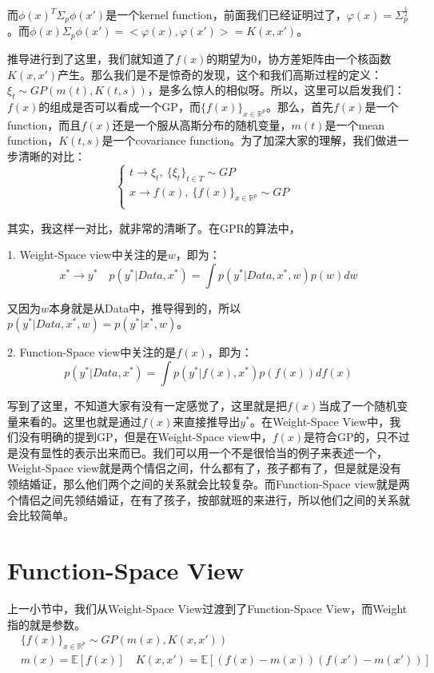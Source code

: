 \documentclass[a4paper]{article}
\begin{document}
而$\phi(x)^T\Sigma_p\phi(x')$是一个kernel function，前面我们已经证明过了，$\varphi(x) = \Sigma_p^{\frac{1}{2}}$。而$\phi(x)\Sigma_p\phi(x') = <\varphi(x),\varphi(x')> = K(x,x')$。

推导进行到了这里，我们就知道了$f(x)$的期望为0，协方差矩阵由一个核函数$K(x,x')$产生。那么我们是不是惊奇的发现，这个和我们高斯过程的定义：$\xi_t \sim GP(m(t),K(t,s))$，是多么惊人的相似呀。所以，这里可以启发我们：{\color{red} $f(x)$的组成是否可以看成一个GP，而$\{f(x)\}_{x\in\mathbb{R}^p}$。}那么，首先$f(x)$是一个function，而且$f(x)$还是一个服从高斯分布的随机变量，$m(t)$是一个mean function，$K(t,s)$是一个covariance function。为了加深大家的理解，我们做进一步清晰的对比：
\begin{equation}
    \left\{
        \begin{array}{ll}
            t \longrightarrow \xi_t, \ \{ \xi_t \}_{t\in T}\sim GP & \\
            x \longrightarrow f(x), \ \{ f(x) \}_{x\in \mathbb{R}^p}\sim GP & \\
\end{array}
\right.
\end{equation}

其实，我这样一对比，就非常的清晰了。在GPR的算法中，

1. Weight-Space view中关注的是$w$，即为：
\begin{equation}
    x^\ast \longrightarrow y^\ast \quad p(y^\ast|Data,x^\ast) = \int p(y^\ast|Data,x^\ast,w)p(w)dw
\end{equation}

又因为$w$本身就是从Data中，推导得到的，所以$p(y^\ast|Data,x^\ast,w) = p(y^\ast|x^\ast,w)$。

2. Function-Space view中关注的是$f(x)$，即为：
\begin{equation}
    p(y^\ast | Data,x^\ast)  = \int p(y^\ast | f(x),x^\ast)p(f(x))df(x)
\end{equation}

写到了这里，不知道大家有没有一定感觉了，这里就是把$f(x)$当成了一个随机变量来看的。这里也就是通过$f(x)$来直接推导出$y^\ast$。在Weight-Space View中，我们没有明确的提到GP，但是在Weight-Space view中，$f(x)$是符合GP的，只不过是没有显性的表示出来而已。我们可以用一个不是很恰当的例子来表述一个，Weight-Space view就是两个情侣之间，什么都有了，孩子都有了，但是就是没有领结婚证，那么他们两个之间的关系就会比较复杂。而Function-Space view就是两个情侣之间先领结婚证，在有了孩子，按部就班的来进行，所以他们之间的关系就会比较简单。

\section{Function-Space View}
上一小节中，我们从Weight-Space View过渡到了Function-Space View，而Weight指的就是参数。
\begin{equation}
    \begin{split}
        & \{f(x)\}_{x\in\mathbb{R}^p}\sim GP(m(x),K(x,x')) \\
        & m(x) = \mathbb{E}[f(x)] \quad K(x,x') = \mathbb{E}[(f(x)-m(x))(f(x')-m(x'))]
    \end{split}
\end{equation}
\end{document}

